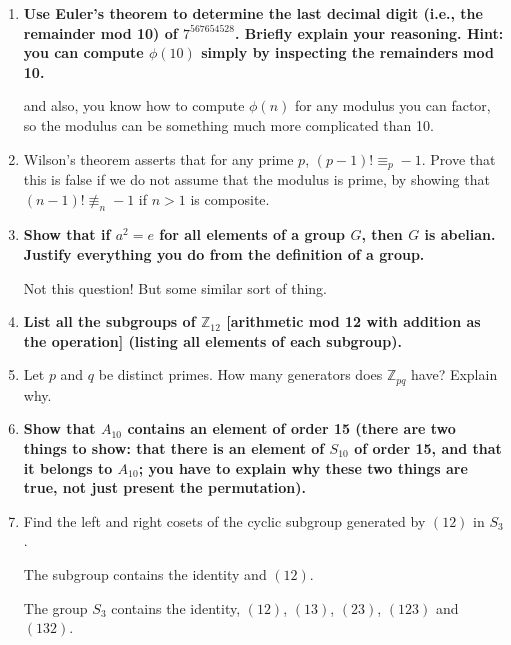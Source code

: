 \documentclass[12pt]{article}
\begin{document}
\begin{enumerate}

\item  {\bf Use Euler's theorem to determine the last decimal digit (i.e., the remainder mod 10) of $7^{567654528}$.  Briefly explain your reasoning.  Hint:  you can compute $\phi(10)$ simply by inspecting the remainders mod 10.}

and also, you know how to compute $\phi(n)$ for any modulus you can factor, so the modulus can be something much more complicated than 10.



\item  Wilson's theorem asserts that for any prime $p$, $(p-1)! \equiv_p -1$.  Prove that this is false if we do not assume that the modulus is prime, by showing that $(n-1)! \not\equiv_n -1$ if $n>1$ is composite.





\item  {\bf Show that if $a^2 = e$ for all elements of a group $G$, then $G$ is abelian.  Justify everything you do from the  definition of a group.}

Not this question!  But some similar sort of thing.



\item  {\bf List all the subgroups of ${\mathbb Z}_{12}$ [arithmetic mod 12 with addition as the operation] (listing all elements of each subgroup).}




\item  Let $p$ and $q$ be distinct primes.  How many generators does ${\mathbb Z}_{pq}$ have?  Explain why.



\item  {\bf Show that $A_{10}$ contains an element of order 15 (there are two things to show:  that there is an element of 
$S_{10}$ of order 15, and that it belongs to $A_{10}$;  you have to explain why these two things are true, not just present the permutation).}



\item  Find the left and right cosets of the cyclic subgroup generated by $(12)$ in $S_3$.

The subgroup contains the identity and $(12)$.

The group $S_3$ contains the identity, $(12)$, $(13)$, $(23)$, $(123)$ and $(132)$.


\end{enumerate}
\end{document}
